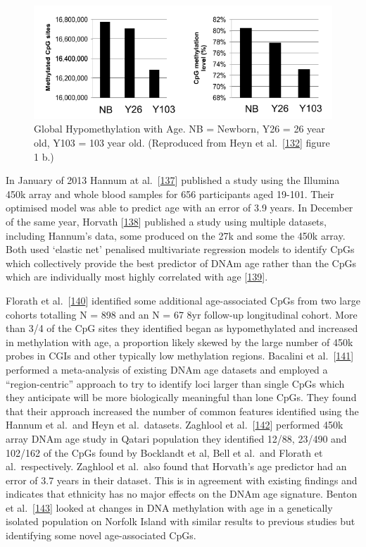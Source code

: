 \documentclass[
]{book}
\begin{document}
\begin{figure}

{\centering \includegraphics[width=0.8\linewidth]{figs/Heyn2012F1b} 

}

\caption{Global Hypomethylation with Age. NB = Newborn, Y26 = 26 year old, Y103 = 103 year old.
(Reproduced from Heyn et al.~{[}\protect\hyperlink{ref-Heyn2012}{132}{]} figure 1 b.)}\label{fig:Heyn2012F1b}
\end{figure}




In January of 2013 Hannum at al.~{[}\protect\hyperlink{ref-Hannum2013}{137}{]} published a study using the Illumina 450k array and whole blood samples for 656 participants aged 19-101.
Their optimised model was able to predict age with an error of 3.9 years.
In December of the same year, Horvath {[}\protect\hyperlink{ref-Horvath2013}{138}{]} published a study using multiple datasets, including Hannum's data, some produced on the 27k and some the 450k array.
Both used `elastic net' penalised multivariate regression models to identify CpGs which collectively provide the best predictor of DNAm age rather than the CpGs which are individually most highly correlated with age {[}\protect\hyperlink{ref-Friedman2010}{139}{]}.

Florath et al.~{[}\protect\hyperlink{ref-Florath2014}{140}{]} identified some additional age-associated CpGs from two large cohorts totalling N = 898 and an N = 67 8yr follow-up longitudinal cohort.
More than 3/4 of the CpG sites they identified began as hypomethylated and increased in methylation with age, a proportion likely skewed by the large number of 450k probes in CGIs and other typically low methylation regions.
Bacalini et al.~{[}\protect\hyperlink{ref-Bacalini2015}{141}{]} performed a meta-analysis of existing DNAm age datasets and employed a ``region-centric'' approach to try to identify loci larger than single CpGs which they anticipate will be more biologically meaningful than lone CpGs.
They found that their approach increased the number of common features identified using the Hannum et al.~and Heyn et al.~datasets.
Zaghlool et al.~{[}\protect\hyperlink{ref-Zaghlool2015}{142}{]} performed 450k array DNAm age study in Qatari population they identified 12/88, 23/490 and 102/162 of the CpGs found by Bocklandt et al, Bell et al.~and Florath et al.~respectively. Zaghlool et al.~also found that Horvath's age predictor had an error of 3.7 years in their dataset.
This is in agreement with existing findings and indicates that ethnicity has no major effects on the DNAm age signature. Benton et al.~{[}\protect\hyperlink{ref-Benton2017}{143}{]} looked at changes in DNA methylation with age in a genetically isolated population on Norfolk Island with similar results to previous studies but identifying some novel age-associated CpGs.
\end{document}
